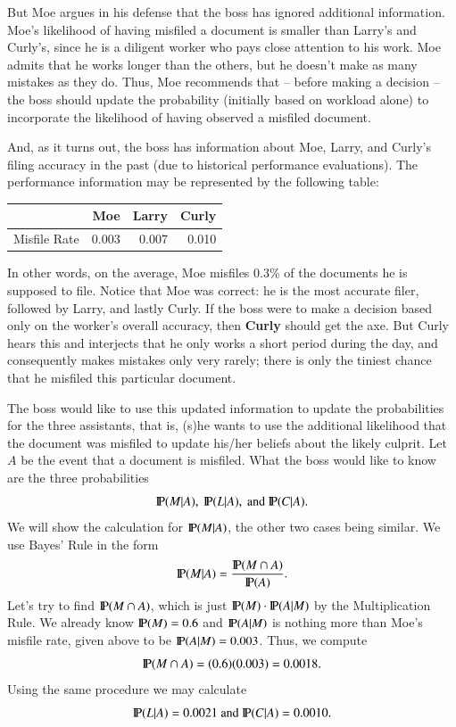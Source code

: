 \documentclass[captions=tableheading]{scrbook}
\begin{document}
\begin{example}
But Moe argues in his defense that the boss has ignored additional information. Moe's likelihood of having misfiled a document is smaller than Larry's and Curly's, since he is a diligent worker who pays close attention to his work. Moe admits that he works longer than the others, but he doesn't make as many mistakes as they do. Thus, Moe recommends that -- before making a decision -- the boss should update the probability (initially based on workload alone) to incorporate the likelihood of having observed a misfiled document.

And, as it turns out, the boss has information about Moe, Larry, and Curly's filing accuracy in the past (due to historical performance evaluations). The performance information may be represented by the following table:


\begin{center}
\begin{tabular}{lrrr}
               &    Moe  &  Larry  &  Curly  \\
\hline
 Misfile Rate  &  0.003  &  0.007  &  0.010  \\
\end{tabular}
\end{center}



In other words, on the average, Moe misfiles 0.3\% of the documents he is supposed to file. Notice that Moe was correct: he is the most accurate filer, followed by Larry, and lastly Curly. If the boss were to make a decision based only on the worker's overall accuracy, then \textbf{Curly} should get the axe. But Curly hears this and interjects that he only works a short period during the day, and consequently makes mistakes only very rarely; there is only the tiniest chance that he misfiled this particular document.

The boss would like to use this updated information to update the probabilities for the three assistants, that is, (s)he wants to use the additional likelihood that the document was misfiled to update his/her beliefs about the likely culprit. Let \(A\) be the event that a document is misfiled. What the boss would like to know are the three probabilities
\[
\P(M|A),\mbox{ }\P(L|A),\mbox{ and }\P(C|A).
\]
We will show the calculation for \(\P(M|A)\), the other two cases being similar. We use Bayes' Rule in the form
\[
\P(M|A)=\frac{\P(M\cap A)}{\P(A)}.
\]
Let's try to find \(\P(M\cap A)\), which is just \(\P(M)\cdot\P(A|M)\) by the Multiplication Rule. We already know \(\P(M)=0.6\) and \(\P(A|M)\) is nothing more than Moe's misfile rate, given above to be \(\P(A|M)=0.003\). Thus, we compute
\[
\P(M\cap A)=(0.6)(0.003)=0.0018.
\]
Using the same procedure we may calculate
\[
\P(L|A)=0.0021\mbox{ and }\P(C|A)=0.0010.
\]


\end{example}
\end{document}

